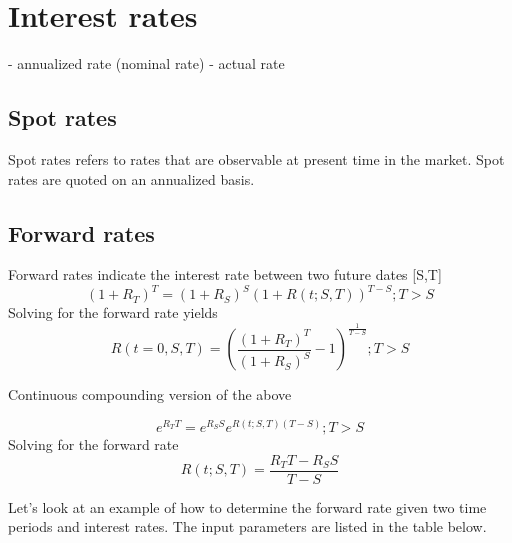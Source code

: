 \documentclass[11pt,a4paper]{article}
\numberwithin{equation}{section}
\begin{document}
\section{Interest rates}

- annualized rate (nominal rate)
- actual rate


\subsection{Spot rates}
Spot rates refers to rates that are observable at present time in the market.
Spot rates are quoted on an annualized basis.

\subsection{Forward rates}
Forward rates indicate the interest rate between two future dates [S,T]
\[
(1+R_T)^T=(1+R_S)^S(1+R(t;S,T))^{T-S}; T>S
\]
Solving for the forward rate yields
\[
R(t=0,S,T)=\left( \frac{(1+R_T)^T}{(1+R_S)^S} - 1 \right)^{\frac{1}{T-S}};T>S
\]

Continuous compounding version of the above

\[
e^{R_TT}=e^{R_SS}e^{R(t;S,T)(T-S)};T>S
\]
Solving for the forward rate
\[
R(t;S,T)=\frac{R_TT-R_SS}{T-S}
\]

Let's look at an example of how to determine the forward rate given two time periods and interest rates. The input parameters are listed in the table below.

\end{document}
